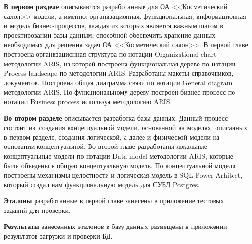 \textbf{В первом разделе} описываются разработанные для ОА <<Косметический салон>> модели,
а именно: организационная, функциональная, информационная и модель бизнес-процессов,
каждая из которых является важным шагом в проектировании базы данным,
способной обеспечить хранение данных, необходимых для решения задач ОА <<Косметический салон>>.
В первой главе построена организационная структура по нотации Organizational chart методологии ARIS,
из которой построена функциональная дерево по нотации Process landscape по методологии ARIS.
Разработаны макеты справочников, документов. Построена общая диаграмма связи по нотации General diagram методологии ARIS.
По функциональному дереву построен бизнес процесс по нотации Business process используя методологию ARIS.

\textbf{Во втором разделе} описывается разработка базы данных.
Данный процесс состоит из: создания концептуальной модели, основанной на моделях, описанных в первом разделе;
создания логической, а далее и физической модели на основании концептуальной.
Во второй главе разработаны локальные концептуальные модели по нотации Data model методологии ARIS,
которые были объедены в общую концептуальную модель.
По концептуальной модели построены механизмы целостности и логическая модель в SQL Power Arhitect,
который создал нам функциональную модель для СУБД Postgres.

\textbf{Эталоны} разработанные в первой главе занесены в приложение тестовых заданий для проверки.

\textbf{Результаты} занесенных эталонов в базу данных размещены в приложении результатов загрузки и проверки БД.
 
\newpage
